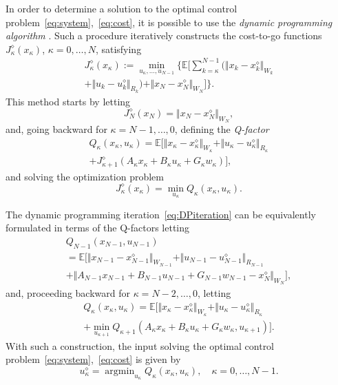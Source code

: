 \documentclass[10pt]{IEEEtran}      %
\newcommand{\bE}{\mathbb{E}}
\theoremstyle{theorem}
\theoremstyle{remark}
\DeclareMathOperator*{\argmin}{argmin}
\begin{document}
In order to determine a solution to the optimal control problem~\eqref{eq:system},~\eqref{eq:cost},
it is possible to use the \emph{dynamic programming algorithm} \cite{bertsekas2005dynamic}.
Such a procedure iteratively constructs the cost-to-go functions
$J_\kappa^\diamond(x_\kappa) $, $\kappa=0,\dots,N$, satisfying
\begin{multline*}
J_\kappa^\diamond(x_\kappa):=\min_{u_\kappa,\dots,u_{N-1}} \biggr\{\bE\biggr[\sum_{k=\kappa}^{N-1}\biggr(\Vert x_k-x_k^\diamond\Vert_{W_k} \\
+\Vert u_k-u_k^\diamond\Vert_{R_k}\biggr)+\Vert x_N-x_N^\diamond\Vert_{W_N}\biggr]\biggr\}.
\end{multline*}
This method starts by letting \[J_N^\diamond(x_N)=\Vert x_N-x_N^\diamond\Vert_{W_N},\]
and, going backward for $\kappa=N-1,\dots,0$, defining the \emph{Q-factor}
\begin{multline}\label{eq:Qfactor}
Q_\kappa(x_\kappa,u_\kappa) = \bE\biggr[\Vert x_\kappa-x_\kappa^\diamond\Vert_{W_\kappa} +\Vert u_\kappa-u_\kappa^\diamond\Vert_{R_\kappa}\\
+J_{\kappa+1}^\diamond(A_\kappa x_\kappa + B_\kappa u_\kappa+G_\kappa w_\kappa)\biggr],
\end{multline}
and solving the optimization problem
\begin{equation}\label{eq:DPiteration}
J_\kappa^\diamond(x_\kappa)=\min_{u_\kappa}Q_\kappa(x_\kappa,u_\kappa).
\end{equation}

The dynamic programming iteration~\eqref{eq:DPiteration} can be equivalently formulated in terms 
of the Q-factors letting
\begin{multline*}
Q_{N-1}(x_{N-1},u_{N-1})\\
=\bE\biggr[\Vert x_{N-1}-x_{N-1}^\diamond\Vert_{W_{N-1}}+\Vert u_{N-1}-u_{N-1}^\diamond\Vert_{R_{N-1}}\\
+\Vert A_{N-1}x_{N-1} + B_{N-1}u_{N-1} + G_{N-1}w_{N-1}-x_{N}^\diamond\Vert_{W_N}\biggr],
\end{multline*}
and, proceeding backward for $\kappa=N-2,\dots,0$, letting
\begin{multline}\label{eq:DPQ}
Q_\kappa(x_\kappa,u_\kappa) = \bE\biggr[\Vert x_\kappa-x_\kappa^\diamond\Vert_{W_\kappa} +\Vert u_\kappa-u_\kappa^\diamond\Vert_{R_\kappa}\\
+\min_{u_{\kappa+1}}Q_{\kappa+1}(A_\kappa x_\kappa + B_\kappa u_\kappa+G_\kappa w_\kappa,u_{\kappa+1})\biggr].
\end{multline}
With such a construction, the input solving the optimal control problem~\eqref{eq:system},~\eqref{eq:cost}
is given by
\begin{equation*}
u_\kappa^\diamond=\argmin_{u_{\kappa}}Q_\kappa(x_\kappa,u_\kappa),\quad \kappa=0,\dots,N-1.
\end{equation*}
\end{document}
